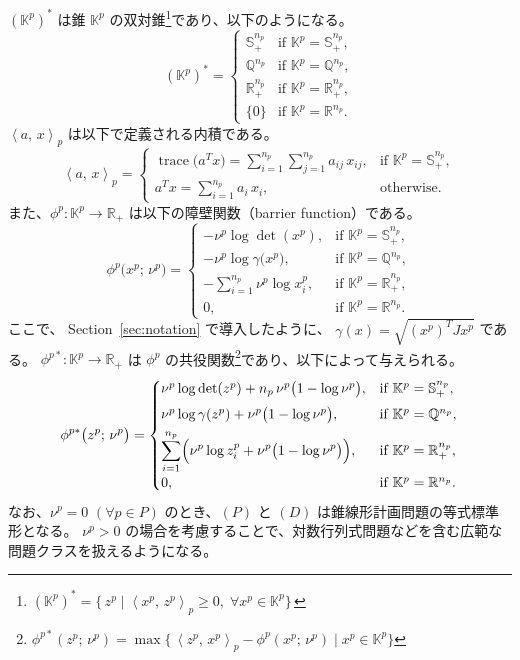 \documentclass{jsarticle}
\newcommand{\inprod}[2]{\left\langle #1, \, #2 \right\rangle}
\begin{document}
$(\mathbb{K}^p)^*$ は錐 $\mathbb{K}^p$ の双対錐\footnote{%
  $(\mathbb{K}^p)^* = \{\, z^p \mid \inprod{x^p}{z^p}_p \ge 0,\;\forall x^p \in \mathbb{K}^p\}\,$
}であり、以下のようになる。
\[
(\mathbb{K}^p)^* = 
\begin{cases}
    \mathbb{S}_{+}^{n_p} & \text{if } \mathbb{K}^{p}=\mathbb{S}_{+}^{n_p},\\
    \mathbb{Q}^{n_p}     & \text{if } \mathbb{K}^{p}=\mathbb{Q}^{n_p},\\
    \mathbb{R}_{+}^{n_p} & \text{if } \mathbb{K}^{p}=\mathbb{R}_{+}^{n_p},\\
    \{0\}                & \text{if } \mathbb{K}^{p}=\mathbb{R}^{n_p}.
\end{cases}
\]
$\inprod{a}{x}_p$ は以下で定義される内積である。
\[
    \inprod{a}{x}_p = 
    \begin{cases}
        \operatorname{trace}\bigl(a^T x\bigr) 
          = \displaystyle \sum_{i=1}^{n_p}\sum_{j=1}^{n_p} a_{ij}\, x_{ij},
          & \text{if } \mathbb{K}^p=\mathbb{S}_{+}^{n_p},\\[6pt]
        a^T x 
          = \displaystyle \sum_{i=1}^{n_p} a_{i}\,x_{i},
          & \text{otherwise}.
    \end{cases}
\]
また、$\phi^p : \mathbb{K}^p \to \mathbb{R}_+$ は以下の障壁関数（barrier function）である。
\[
\phi^p\bigl(x^p;\,\nu^p\bigr) =
    \begin{cases}
      -\nu^p \log \det(x^p), & \text{if } \mathbb{K}^{p}=\mathbb{S}_{+}^{n_p},\\
      -\nu^p \log \gamma\bigl(x^p\bigr), & \text{if } \mathbb{K}^{p}=\mathbb{Q}^{n_p},\\
      -\sum_{i=1}^{n_p} \nu^p \log x^p_i, 
         & \text{if } \mathbb{K}^{p}=\mathbb{R}_{+}^{n_p},\\
      0, & \text{if } \mathbb{K}^{p}=\mathbb{R}^{n_p}.
    \end{cases}
\]
ここで、 Section~\ref{sec:notation} で導入したように、 $\gamma(x)=\sqrt{(x^p)^T J x^p}$ である。
$\phi^{p*} : \mathbb{K}^p \to \mathbb{R}_+$ は $\phi^p$ の共役関数\footnote{%
  $\phi^{p*}(z^p;\,\nu^p)=\max \{\,\inprod{z^p}{x^p}_p - \phi^p(x^p;\,\nu^p)\mid x^p\in \mathbb{K}^p\}$
}であり、以下によって与えられる。
\[
\phi^{p*}\bigl(z^p;\,\nu^p\bigr) =
    \begin{cases}
      \nu^p \log \det(z^p) + n_p\,\nu^p \bigl(1-\log \nu^p\bigr),
         & \text{if } \mathbb{K}^{p}=\mathbb{S}_{+}^{n_p},\\[4pt]
      \nu^p \log \gamma(z^p) + \nu^p\bigl(1-\log \nu^p\bigr),
         & \text{if } \mathbb{K}^{p}=\mathbb{Q}^{n_p},\\[4pt]
      \displaystyle 
        \sum_{i=1}^{n_p} \Bigl(\nu^p \log z^p_i + \nu^p\bigl(1-\log \nu^p\bigr)\Bigr),
         & \text{if } \mathbb{K}^{p}=\mathbb{R}_{+}^{n_p},\\[3pt]
      0, & \text{if } \mathbb{K}^{p}=\mathbb{R}^{n_p}.
    \end{cases}
\]
なお、$\nu^p = 0$ $(\forall p \in P)$ のとき、$(P)$ と $(D)$ は錐線形計画問題の等式標準形となる。
$\nu^p > 0$ の場合を考慮することで、対数行列式問題などを含む広範な問題クラスを扱えるようになる。
\end{document}
